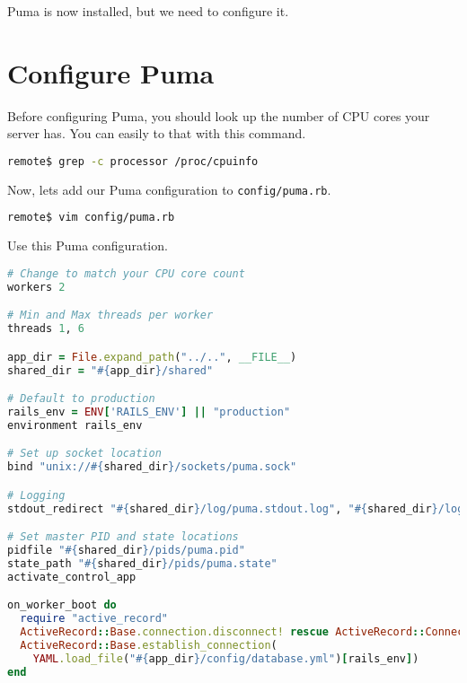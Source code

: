 Puma is now installed, but we need to configure it.

\section{Configure Puma}

Before configuring Puma, you should look up the number of CPU cores
your server has. You can easily to that with this command.

\begin{minipage}{\linewidth}
\begin{lstlisting}[language=bash]
remote$ grep -c processor /proc/cpuinfo
\end{lstlisting}
\end{minipage}

Now, let\textquotesingle s add our Puma configuration to \texttt{config/puma.rb}.

\begin{minipage}{\linewidth}
\begin{lstlisting}[language=bash]
remote$ vim config/puma.rb
\end{lstlisting}
\end{minipage}

Use this Puma configuration.

\begin{minipage}{\linewidth}
  \begin{lstlisting}[language=ruby, caption={config/puma.rb}]
# Change to match your CPU core count
workers 2

# Min and Max threads per worker
threads 1, 6

app_dir = File.expand_path("../..", __FILE__)
shared_dir = "#{app_dir}/shared"

# Default to production
rails_env = ENV['RAILS_ENV'] || "production"
environment rails_env

# Set up socket location
bind "unix://#{shared_dir}/sockets/puma.sock"

# Logging
stdout_redirect "#{shared_dir}/log/puma.stdout.log", "#{shared_dir}/log/puma.stderr.log", true

# Set master PID and state locations
pidfile "#{shared_dir}/pids/puma.pid"
state_path "#{shared_dir}/pids/puma.state"
activate_control_app

on_worker_boot do
  require "active_record"
  ActiveRecord::Base.connection.disconnect! rescue ActiveRecord::ConnectionNotEstablished
  ActiveRecord::Base.establish_connection(
    YAML.load_file("#{app_dir}/config/database.yml")[rails_env])
end
\end{lstlisting}
\end{minipage}

